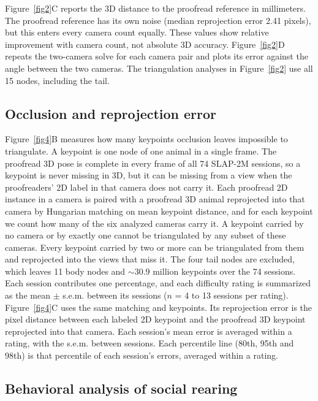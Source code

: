 \documentclass[pdflatex, sn-nature]{sn-jnl}
\theoremstyle{thmstyleone}%
\theoremstyle{thmstyletwo}%
\theoremstyle{thmstylethree}%
\begin{document}
Figure~\ref{fig2}C reports the 3D distance to the proofread reference in millimeters. The proofread reference has its own noise (median reprojection error 2.41 pixels), but this enters every camera count equally. These values show relative improvement with camera count, not absolute 3D accuracy. Figure~\ref{fig2}D repeats the two-camera solve for each camera pair and plots its error against the angle between the two cameras. The triangulation analyses in Figure~\ref{fig2} use all 15 nodes, including the tail.

\subsection{Occlusion and reprojection error}\label{methods-recovery}

Figure~\ref{fig4}B measures how many keypoints occlusion leaves impossible to triangulate. A keypoint is one node of one animal in a single frame. The proofread 3D pose is complete in every frame of all 74 SLAP-2M sessions, so a keypoint is never missing in 3D, but it can be missing from a view when the proofreaders' 2D label in that camera does not carry it. Each proofread 2D instance in a camera is paired with a proofread 3D animal reprojected into that camera by Hungarian matching on mean keypoint distance, and for each keypoint we count how many of the six analyzed cameras carry it. A keypoint carried by no camera or by exactly one cannot be triangulated by any subset of these cameras. Every keypoint carried by two or more can be triangulated from them and reprojected into the views that miss it. The four tail nodes are excluded, which leaves 11 body nodes and $\sim$30.9 million keypoints over the 74 sessions. Each session contributes one percentage, and each difficulty rating is summarized as the mean $\pm$ s.e.m. between its sessions ($n$ = 4 to 13 sessions per rating). Figure~\ref{fig4}C uses the same matching and keypoints. Its reprojection error is the pixel distance between each labeled 2D keypoint and the proofread 3D keypoint reprojected into that camera. Each session's mean error is averaged within a rating, with the s.e.m. between sessions. Each percentile line (80th, 95th and 98th) is that percentile of each session's errors, averaged within a rating.

\subsection{Behavioral analysis of social rearing}\label{methods-behavior}
\end{document}
